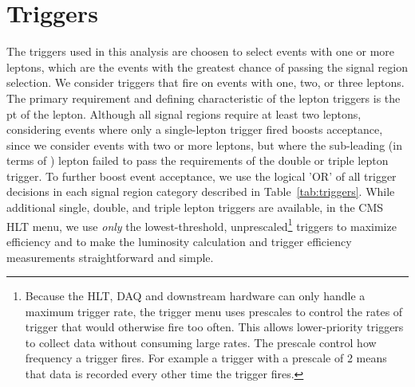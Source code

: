 \section{Triggers}
The triggers used in this analysis are choosen to select events with one or more leptons, which are the events with the greatest
chance of passing the signal region selection. We consider triggers that fire on events with one, two, or three leptons. The primary
requirement and defining characteristic of the lepton triggers is the pt of the lepton.
Although all signal regions require at least two leptons, considering events where only a single-lepton trigger fired boosts acceptance, since
we consider events with two or more leptons, but where the sub-leading (in terms of \pt) lepton failed to pass the requirements of the
double or triple lepton trigger. To further boost event acceptance, we use the logical 'OR' of all trigger decisions in each signal
region category described in Table~\ref{tab:triggers}. While additional single, double, and triple lepton triggers are available,
in the CMS HLT menu, we use \emph{only} the lowest-threshold, unprescaled\footnote{Because the HLT, DAQ and downstream hardware can only handle a maximum trigger
rate, the trigger menu
uses prescales to control the rates of trigger that would otherwise fire too often. This allows lower-priority triggers to collect data
without consuming large rates. The prescale control how frequency a trigger fires. For example a trigger with a prescale of 2 means that
data is recorded every other time the trigger fires.} triggers to maximize efficiency and to make the luminosity calculation and trigger efficiency measurements
straightforward and simple. 

